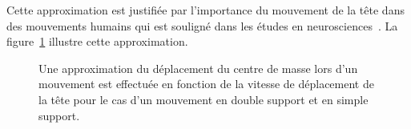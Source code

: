 Cette approximation est justifiée par l'importance du mouvement de la tête dans des mouvements humains
qui est souligné dans les études en neurosciences~\cite{sreenivasa09}.
La figure~\ref{fig:comApprox} illustre cette approximation.
\begin{figure}[t]
  \begin{center}
    \subfigure{
    \resizebox{.47\textwidth}{!} {
    
    }
    }
    \subfigure{
    \resizebox{.47\textwidth}{!} {
    
    }
    }
  \end{center}
  \caption[Approximation de la trajectoire du centre de masse.]{Une approximation du déplacement du centre de masse lors d'un mouvement est effectuée
  en fonction de la vitesse de déplacement de la tête pour le cas d'un mouvement en
  double support et en simple support.}
  \label{fig:comApprox}
\end{figure}
\FloatBarrier
